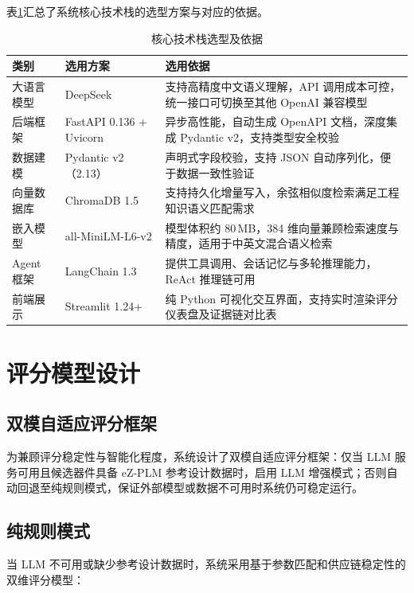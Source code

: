 表\ref{tab:tech}汇总了系统核心技术栈的选型方案与对应的依据。
\begin{table}[htbp]
\centering
\caption{核心技术栈选型及依据}
\label{tab:tech}
\footnotesize
\setlength{\tabcolsep}{4pt}
\renewcommand{\arraystretch}{0.95}
\begin{tabularx}{\textwidth}{p{2cm}p{4cm}X}
\toprule
\textbf{类别} & \textbf{选用方案} & \textbf{选用依据} \\
\midrule
大语言模型 & DeepSeek & 支持高精度中文语义理解，API 调用成本可控，统一接口可切换至其他 OpenAI 兼容模型 \\
后端框架 & FastAPI 0.136 + Uvicorn & 异步高性能，自动生成 OpenAPI 文档，深度集成 Pydantic v2，支持类型安全校验 \\
数据建模 & Pydantic v2（2.13） & 声明式字段校验，支持 JSON 自动序列化，便于数据一致性验证 \\
向量数据库 & ChromaDB 1.5 & 支持持久化增量写入，余弦相似度检索满足工程知识语义匹配需求 \\
嵌入模型 & all-MiniLM-L6-v2 & 模型体积约 80\,MB，384 维向量兼顾检索速度与精度，适用于中英文混合语义检索 \\
Agent 框架 & LangChain 1.3 & 提供工具调用、会话记忆与多轮推理能力，ReAct 推理链可用 \\
前端展示 & Streamlit 1.24+ & 纯 Python 可视化交互界面，支持实时渲染评分仪表盘及证据链对比表 \\
\bottomrule
\end{tabularx}
\end{table}

\section{评分模型设计}
\subsection{双模自适应评分框架}

为兼顾评分稳定性与智能化程度，系统设计了双模自适应评分框架：仅当 LLM 服务可用且候选器件具备 eZ-PLM 参考设计数据时，启用 LLM 增强模式；否则自动回退至纯规则模式，保证外部模型或数据不可用时系统仍可稳定运行。

\subsection{纯规则模式}

当 LLM 不可用或缺少参考设计数据时，系统采用基于参数匹配和供应链稳定性的双维评分模型：

